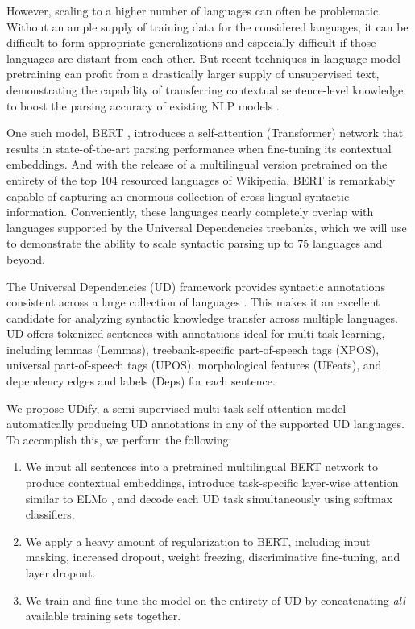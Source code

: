 \documentclass[11pt,a4paper]{article}
\begin{document}
However, scaling to a higher number of languages can often be problematic.
Without an ample supply of training data for the considered languages, it can be difficult to form appropriate generalizations and especially difficult if those languages are distant from each other.
But recent techniques in language model pretraining can profit from a drastically larger supply of unsupervised text, demonstrating the capability of transferring contextual sentence-level knowledge to boost the parsing accuracy of existing NLP models \cite{howard2018universal, Peters:2018, devlin2018bert}.

One such model, BERT \cite{devlin2018bert}, introduces a self-attention (Transformer) network that results in state-of-the-art parsing performance when fine-tuning its contextual embeddings.
And with the release of a multilingual version pretrained on the entirety of the top 104 resourced languages of Wikipedia, BERT is remarkably capable of capturing an enormous collection of cross-lingual syntactic information.
Conveniently, these languages nearly completely overlap with languages supported by the Universal Dependencies treebanks, which we will use to demonstrate the ability to scale syntactic parsing up to 75 languages and beyond.

The Universal Dependencies (UD) framework provides syntactic annotations consistent across a large collection of languages \cite{11234/1-2895, zeman-EtAl:2018:K18-2}.
This makes it an excellent candidate for analyzing syntactic knowledge transfer across multiple languages.
UD offers tokenized sentences with annotations ideal for multi-task learning, including lemmas ({\sc Lemmas}), treebank-specific part-of-speech tags ({\sc XPOS}), universal part-of-speech tags ({\sc UPOS}), morphological features ({\sc UFeats}), and dependency edges and labels ({\sc Deps}) for each sentence.

We propose UDify, a semi-supervised multi-task self-attention model automatically producing UD annotations in any of the supported UD languages.
To accomplish this, we perform the following:

\begin{enumerate}
    \item We input all sentences into a pretrained multilingual BERT network to produce contextual embeddings, introduce task-specific layer-wise attention similar to ELMo \cite{Peters:2018}, and decode each UD task simultaneously using softmax classifiers.
    \item We apply a heavy amount of regularization to BERT, including input masking, increased dropout, weight freezing, discriminative fine-tuning, and layer dropout.
    \item We train and fine-tune the model on the entirety of UD by concatenating {\it all} available training sets together.
\end{enumerate}
\end{document}
